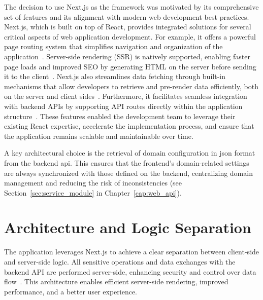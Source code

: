 The decision to use Next.js as the framework was motivated by its comprehensive set of features and its alignment with modern web development best practices. Next.js, which is built on top of React, provides integrated solutions for several critical aspects of web application development. For example, it offers a powerful page routing system that simplifies navigation and organization of the application~\cite{nextjs-app-router}. Server-side rendering (SSR) is natively supported, enabling faster page loads and improved SEO by generating HTML on the server before sending it to the client~\cite{nextjs-server-client-components}. Next.js also streamlines data fetching through built-in mechanisms that allow developers to retrieve and pre-render data efficiently, both on the server and client sides~\cite{nextjs-data-fetching}. Furthermore, it facilitates seamless integration with backend APIs by supporting API routes directly within the application structure~\cite{nextjs-api-routes}. These features enabled the development team to leverage their existing React expertise, accelerate the implementation process, and ensure that the application remains scalable and maintainable over time.

A key architectural choice is the retrieval of domain configuration in \ac{json} format from the backend \ac{api}. This ensures that the frontend's domain-related settings are always synchronized with those defined on the backend, centralizing domain management and reducing the risk of inconsistencies (see Section~\ref{sec:service_module} in Chapter~\ref{cap:web_api}).

\section{Architecture and Logic Separation}
\label{sec:architecture-and-logic-separation}

The application leverages Next.js to achieve a clear separation between client-side and server-side logic. All sensitive operations and data exchanges with the backend API are performed server-side, enhancing security and control over data flow~\cite{nextjs-server-client-components,nextjs-data-fetching,auth0-nextjs-server-actions}. This architecture enables efficient server-side rendering, improved performance, and a better user experience.

